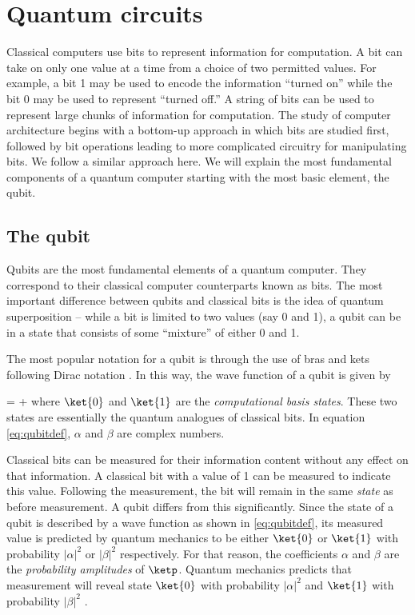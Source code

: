\chapter{Quantum circuits\label{ch:qcirc}}
Classical computers use bits to represent information for computation. A bit can take on only one value at a time from a choice of two permitted values. For example, a bit 1 may be used to encode the information ``turned on'' while the bit 0 may be used to represent ``turned off.'' A string of bits can be used to represent large chunks of information for computation. The study of computer architecture begins with a bottom-up approach in which bits are studied first, followed by bit operations leading to more complicated circuitry for manipulating bits. We follow a similar approach here. We will explain the most fundamental components of a quantum computer starting with the most basic element, the qubit.

\section{The qubit}
Qubits are the most fundamental elements of a quantum computer. They correspond to their classical computer counterparts known as bits. The most important difference between qubits and classical bits is the idea of quantum superposition -- while a bit is limited to two values (say 0 and 1), a qubit can be in a state that consists of some ``mixture'' of either 0 and 1. 

The most popular notation for a qubit is through the use of bras and kets following Dirac notation \cite{diracqmech}. In this way, the wave function of a qubit is given by

\beq
\label{eq:qubitdef}
\ketp = \alpha{} + \beta{}
\eeq
where $\ket{0}$ and $\ket{1}$ are the \textit{computational basis states}. These two states are essentially the quantum analogues of classical bits. In equation \eqref{eq:qubitdef}, $\alpha$ and $\beta$ are complex numbers. 

Classical bits can be measured for their information content without any effect on that information. A classical bit with a value of 1 can be measured to indicate this value. Following the measurement, the bit will remain in the same \textit{state} as before measurement. A qubit differs from this significantly. Since the state of a qubit is described by a wave function as shown in \eqref{eq:qubitdef}, its measured value is predicted by quantum mechanics to be either $\ket{0}$ or $\ket{1}$ with probability $|\alpha|^2$ or $|\beta|^2$ respectively. For that reason, the coefficients $\alpha$ and $\beta$ are the \textit{probability amplitudes} of $\ketp$. Quantum mechanics predicts that measurement will reveal state $\ket{0}$ with probability $|\alpha|^2$ and $\ket{1}$ with probability $|\beta|^2$ \cite{griffiths}.


